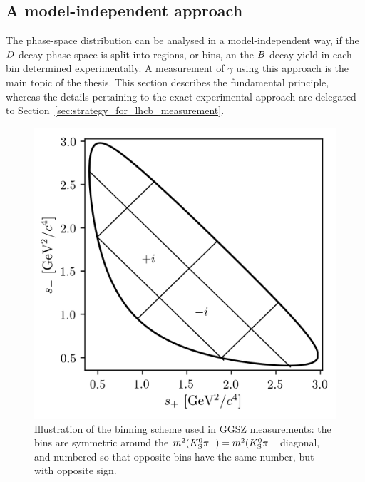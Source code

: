 \subsection{A model-independent approach} %
\label{sub:a_model_independent_approach}


The phase-space distribution can be analysed in a model-independent way, if the ${D}$-decay phase space is split into regions, or bins, an the ${B}$ decay yield in each bin determined experimentally. A measurement of $\gamma$ using this approach is the main topic of the thesis. This section describes the fundamental principle, whereas the details pertaining to the exact experimental approach are delegated to Section~\ref{sec:strategy_for_lhcb_measurement}. 

\begin{figure}[tb]
     \centering
     \includegraphics[width=0.55\columnwidth]{figures/theory/binnings/binning_example.png}
     \caption{Illustration of the binning scheme used in GGSZ measurements: the bins are symmetric around the $m^2({{K}^0_{\mathrm{S}}}{{\pi}^+})=m^2({{K}^0_{\mathrm{S}}}{{\pi}^-}$ diagonal, and numbered so that opposite bins have the same number, but with opposite sign.}
     \label{fig:GGSZ_bin_principle}
 \end{figure} 

